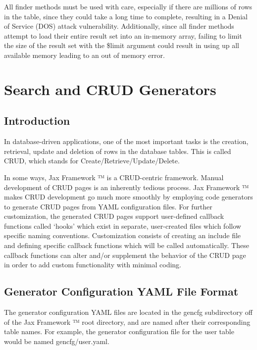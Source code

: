 \documentclass[letterpaper,10pt,english]{sphinxmanual}
\begin{document}
All finder methods must be used with care, especially if there are millions of rows in the table,
since they could take a long time to complete, resulting in a Denial of Service (DOS) attack
vulnerability.  Additionally, since all finder methods attempt to load their entire result set into
an in-memory array, failing to limit the size of the result set with the \$limit argument could
result in using up all available memory leading to an out of memory error.


\chapter{Search and CRUD Generators}
\label{jaxFrameworkGuide:id17}

\section{Introduction}
\label{jaxFrameworkGuide:id18}
In database-driven applications, one of the most important tasks is the creation, retrieval, update
and deletion of rows in the database tables.  This is called CRUD, which stands for
Create/Retrieve/Update/Delete.

In some ways, Jax Framework ™ is a CRUD-centric framework.  Manual development of CRUD pages
is an inherently tedious process.  Jax Framework ™ makes CRUD development go much more
smoothly by employing code generators to generate CRUD pages from YAML configuration files.  For
further customization, the generated CRUD pages support user-defined callback functions called
`hooks' which exist in separate, user-created files which follow specific naming conventions.
Customization consists of creating an include file and defining specific callback functions which
will be called automatically.  These callback functions can alter and/or supplement the behavior of
the CRUD page in order to add custom functionality with minimal coding.


\section{Generator Configuration YAML File Format}
\label{jaxFrameworkGuide:generator-configuration-yaml-file-format}
The generator configuration YAML files are located in the gencfg subdirectory off of the Jax
Framework ™ root directory, and are named after their corresponding table names.  For example,
the generator configuration file for the user table would be named gencfg/user.yaml.
\end{document}
